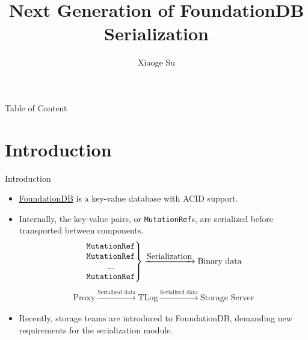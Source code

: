 \documentclass[9pt]{beamer}
\begin{document}
    \title{Next Generation of FoundationDB Serialization}
    \author{Xiaoge Su}
    \begin{frame}
        \maketitle
    \end{frame}

    \begin{frame}{Table of Content}
        \tableofcontents
    \end{frame}

    \section{Introduction}

    \begin{frame}{Introduction}
        \begin{itemize}
            \item \href{https://www.foundationdb.org}{FoundationDB} is a key-value database with ACID support.
            \item Internally, the key-value pairs, or \texttt{MutationRef}s, are \alert{serialized} before transported between components.
            \begin{align}
                \left.
                \begin{matrix}
                    \mbox{\texttt{MutationRef}}\\
                    \mbox{\texttt{MutationRef}}\\
                    ...\\
                    \mbox{\texttt{MutationRef}}\\
                \end{matrix}
                \right\}\xrightarrow{\scriptstyle \mbox{Serialization}} \mbox{Binary data}\nonumber
            \end{align}
            \begin{align}
                \mbox{Proxy} \xrightarrow{\scriptstyle \mbox{Serialized data}} \mbox{TLog} \xrightarrow{\scriptstyle \mbox{Serialized data}}\mbox{Storage Server}\nonumber
            \end{align}

            \item Recently, storage teams are introduced to FoundationDB, demanding new requirements for the serialization module.
        \end{itemize}
    \end{frame}
\end{document}

